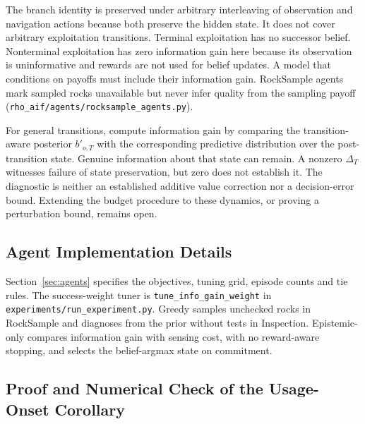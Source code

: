 \documentclass[runningheads]{llncs}
\begin{document}
The branch identity is preserved under arbitrary interleaving of observation and navigation actions because both preserve the hidden state. It does not cover arbitrary exploitation transitions. Terminal exploitation has no successor belief. Nonterminal exploitation has zero information gain here because its observation is uninformative and rewards are not used for belief updates. A model that conditions on payoffs must include their information gain. RockSample agents mark sampled rocks unavailable but never infer quality from the sampling payoff (\texttt{rho\_\allowbreak aif/\allowbreak agents/\allowbreak rocksample\_\allowbreak agents.py}).

\begin{remark}
\label{rem:transition-aware}
For general transitions, compute information gain by comparing the transition-aware posterior $b'_{o,T}$ with the corresponding predictive distribution over the post-transition state. Genuine information about that state can remain. A nonzero $\Delta_T$ witnesses failure of state preservation, but zero does not establish it. The diagnostic is neither an established additive value correction nor a decision-error bound. Extending the budget procedure to these dynamics, or proving a perturbation bound, remains open.
\end{remark}



\subsection{Agent Implementation Details}
\label{app:theory_agents}

Section~\ref{sec:agents} specifies the objectives, tuning grid, episode counts and tie rules. The success-weight tuner is \texttt{tune\_\allowbreak info\_\allowbreak gain\_\allowbreak weight} in \texttt{experiments/\allowbreak run\_\allowbreak experiment.py}. Greedy samples unchecked rocks in RockSample and diagnoses from the prior without tests in Inspection. Epistemic-only compares information gain with sensing cost, with no reward-aware stopping, and selects the belief-argmax state on commitment.

\subsection{Proof and Numerical Check of the Usage-Onset Corollary}
\label{app:theory_budget_proofs}
\end{document}
